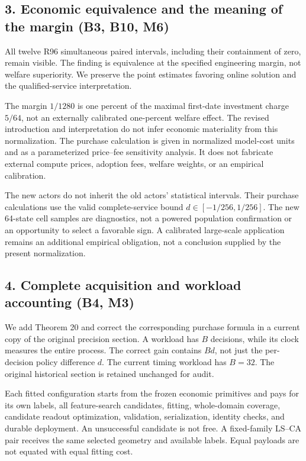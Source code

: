 \hypertarget{economic-equivalence-and-the-meaning-of-the-margin-b3-b10-m6}{%
\subsection{3. Economic equivalence and the meaning of the margin (B3,
B10,
M6)}\label{economic-equivalence-and-the-meaning-of-the-margin-b3-b10-m6}}

All twelve R96 simultaneous paired intervals, including their
containment of zero, remain visible. The finding is equivalence at the
specified engineering margin, not welfare superiority. We preserve the
point estimates favoring online solution and the qualified-service
interpretation.

The margin \(1/1280\) is one percent of the maximal first-date
investment charge \(5/64\), not an externally calibrated one-percent
welfare effect. The revised introduction and interpretation do not infer
economic materiality from this normalization. The purchase calculation
is given in normalized model-cost units and as a parameterized
price--fee sensitivity analysis. It does not fabricate external compute
prices, adoption fees, welfare weights, or an empirical calibration.

The new actors do not inherit the old actors' statistical intervals.
Their purchase calculations use the valid complete-service bound
\(d\in[-1/256,1/256]\). The new 64-state cell samples are diagnostics,
not a powered population confirmation or an opportunity to select a
favorable sign. A calibrated large-scale application remains an
additional empirical obligation, not a conclusion supplied by the
present normalization.

\hypertarget{complete-acquisition-and-workload-accounting-b4-m3}{%
\subsection{4. Complete acquisition and workload accounting (B4,
M3)}\label{complete-acquisition-and-workload-accounting-b4-m3}}

We add Theorem 20 and correct the corresponding purchase formula in a
current copy of the original precision section. A workload has \(B\)
decisions, while its clock measures the entire process. The correct gain
contains \(B d\), not just the per-decision policy difference \(d\). The
current timing workload has \(B=32\). The original historical section is
retained unchanged for audit.

Each fitted configuration starts from the frozen economic primitives and
pays for its own labels, all feature-search candidates, fitting,
whole-domain coverage, candidate readout optimization, validation,
serialization, identity checks, and durable deployment. An unsuccessful
candidate is not free. A fixed-family LS--CA pair receives the same
selected geometry and available labels. Equal payloads are not equated
with equal fitting cost.

